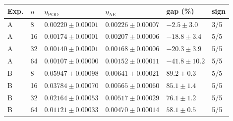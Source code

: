 \begin{tabular}{llllll}
\toprule
Exp. & $n$ & $\eta_{\mathrm{POD}}$ & $\eta_{\mathrm{AE}}$ & gap (\%) & sign \\
\midrule
A & 8 & $0.00220 \pm 0.00001$ & $0.00226 \pm 0.00007$ & $-2.5 \pm 3.0$ & 3/5 \\
A & 16 & $0.00174 \pm 0.00001$ & $0.00207 \pm 0.00006$ & $-18.8 \pm 3.4$ & 5/5 \\
A & 32 & $0.00140 \pm 0.00001$ & $0.00168 \pm 0.00006$ & $-20.3 \pm 3.9$ & 5/5 \\
A & 64 & $0.00107 \pm 0.00000$ & $0.00152 \pm 0.00011$ & $-41.8 \pm 10.2$ & 5/5 \\
\midrule
B & 8 & $0.05947 \pm 0.00098$ & $0.00641 \pm 0.00021$ & $89.2 \pm 0.3$ & 5/5 \\
B & 16 & $0.03784 \pm 0.00070$ & $0.00565 \pm 0.00060$ & $85.1 \pm 1.4$ & 5/5 \\
B & 32 & $0.02164 \pm 0.00053$ & $0.00517 \pm 0.00029$ & $76.1 \pm 1.2$ & 5/5 \\
B & 64 & $0.01121 \pm 0.00033$ & $0.00470 \pm 0.00014$ & $58.1 \pm 0.5$ & 5/5 \\
\bottomrule
\end{tabular}
